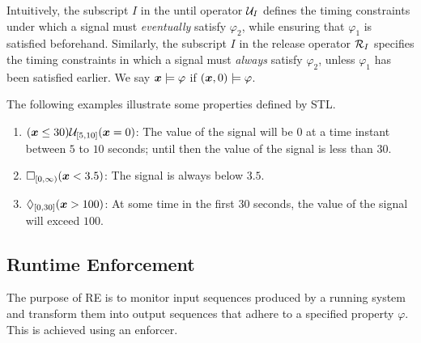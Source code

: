             Intuitively, the subscript $I$ in the until operator $\until_I$ defines the timing constraints under which a signal must \emph{eventually} satisfy $\varphi_2$, while ensuring that $\varphi_1$ is satisfied beforehand. Similarly, the subscript $I$ in the release operator $\release_I$ specifies the timing constraints in which a signal must \emph{always} satisfy $\varphi_2$, unless $\varphi_1$ has been satisfied earlier. We say  $\bm{x}\models\varphi$ if $(\bm{x},0)\models \varphi$.
        
                \begin{example}
    		      \label{example:Properties in STL}
                The following examples illustrate some properties defined by STL.
    		    \begin{enumerate}
                    \item $(\signal  \leq 30) \until_{[5,10]} (\signal = 0)$: The value of the signal will be $0$ at a time instant between $5$ to $10$ seconds; until then the value of the signal is less than $30$.
    		        \item $\always_{[0,\infty)} (\signal < 3.5)$: The signal is always below $3.5$.
                    \item $\eventually_{[0,30]} (\signal > 100)$: At some time in the first $30$ seconds, the value of the signal will exceed $100$. \qedT
    		    \end{enumerate}
    	    \end{example} 


    \subsection{Runtime Enforcement}
    \label{Preliminaries to Runtime Enforcement}
    The purpose of RE is to monitor input sequences produced by a running system and transform them into output sequences that adhere to a specified property $\varphi$. This is achieved using an enforcer.
    
